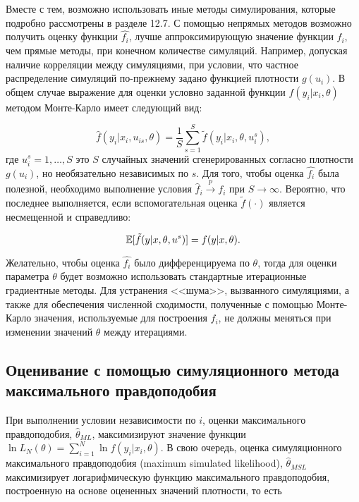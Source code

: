 Вместе с тем, возможно использовать иные методы симулирования, которые подробно рассмотрены в разделе 12.7. С помощью непрямых методов возможно получить оценку функции $\hat{f_i}$, лучше аппроксимирующую значение функции $f_i$, чем прямые методы, при конечном количестве симуляций. Например, допуская наличие корреляции между симуляциями, при условии, что частное распределение симуляций по-прежнему задано функцией плотности $g(u_i)$. В общем случае выражение для оценки условно заданной функции $f(y_i|x_i,\theta)$ методом Монте-Карло имеет следующий вид:

\begin{equation}
\hat{f}(y_i|x_i,u_{is},\theta)=\dfrac{1}{S}\sum^{S}_{s=1}\tilde{f}(y_i|x_i,\theta,u^{s}_i),
\end{equation}
где $u^{s}_i=1,\ldots ,S$ это $S$ случайных значений сгенерированных согласно плотности $g(u_i)$, но необязательно независимых по $s$. Для того, чтобы оценка $\hat{f_i}$ была полезной, необходимо выполнение условия $\hat{f}_i \stackrel{p}{\rightarrow} f_i$ при $S \rightarrow \infty$. Вероятно, что последнее выполняется, если вспомогательная оценка $\tilde{f}(\cdot)$ является несмещенной и справедливо:

\begin{equation}
\mathbb{E}[\tilde{f}(y|x,\theta,u^s)]=f(y|x,\theta).
\end{equation}

Желательно, чтобы оценка $\hat{f_i}$ было дифференцируема по $\theta$, тогда для оценки параметра $\theta$ будет возможно использовать стандартные итерационные градиентные методы. Для устранения <<шума>>, вызванного симуляциями, а также для обеспечения численной сходимости, полученные с помощью Монте-Карло значения, используемые для построения $\hat{f}_i$, не должны меняться при изменении значений $\theta$ между итерациями. 

\subsection{Оценивание с помощью симуляционного метода максимального правдоподобия}

При выполнении условии независимости по $i$, оценки максимального правдоподобия, $\hat{\theta}_{ML}$, максимизируют значение функции $\ln{L_N}(\theta)=\sum^{N}_{i=1}\ln{f}(y_i|x_i,\theta)$. В свою очередь, оценка симуляционного максимального правдоподобия (maximum simulated likelihood), $\hat{\theta}_{MSL}$ максимизирует логарифмическую функцию максимального правдоподобия, построенную на основе оцененных значений плотности, то есть

